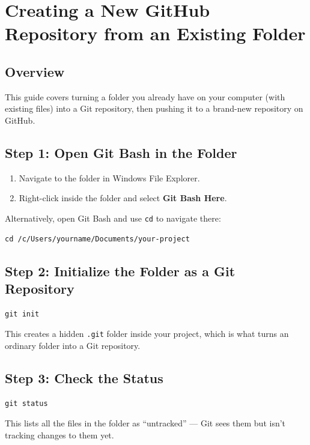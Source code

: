\documentclass[../main.tex]{subfiles}
\begin{document}
\section{Creating a New GitHub Repository from an Existing Folder}

\subsection{Overview}
This guide covers turning a folder you already have on your
computer (with existing files) into a Git repository, then
pushing it to a brand-new repository on GitHub.

\subsection{Step 1: Open Git Bash in the Folder}
\begin{enumerate}[leftmargin=*]
    \item Navigate to the folder in Windows File Explorer.
    \item Right-click inside the folder and select
    \textbf{Git Bash Here}.
\end{enumerate}

Alternatively, open Git Bash and use \texttt{cd} to navigate there:

\begin{lstlisting}
cd /c/Users/yourname/Documents/your-project
\end{lstlisting}

\subsection{Step 2: Initialize the Folder as a Git Repository}
\begin{lstlisting}
git init
\end{lstlisting}

This creates a hidden \texttt{.git} folder inside your project,
which is what turns an ordinary folder into a Git repository.

\subsection{Step 3: Check the Status}
\begin{lstlisting}
git status
\end{lstlisting}

This lists all the files in the folder as ``untracked'' — Git
sees them but isn't tracking changes to them yet.
\end{document}
